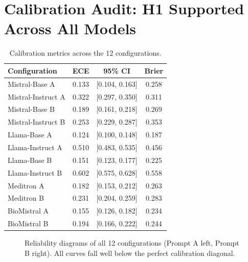 \section{Calibration Audit: H1 Supported Across All Models}
\label{sec:res-h1}


\begin{table}[htbp]
    \centering
    \caption{Calibration metrics across the 12 configurations.}
    \label{tab:res-calibration}
    \begin{tabular}{@{}lccc@{}}
        \toprule
        \textbf{Configuration} & \textbf{ECE} & \textbf{95\% CI} & \textbf{Brier} \\
        \midrule
        Mistral-Base A     & 0.133 & [0.104, 0.163] & 0.258 \\
        Mistral-Instruct A & 0.322 & [0.297, 0.350] & 0.311 \\
        Mistral-Base B     & 0.189 & [0.161, 0.218] & 0.269 \\
        Mistral-Instruct B & 0.253 & [0.229, 0.287] & 0.353 \\
        Llama-Base A       & 0.124 & [0.100, 0.148] & 0.187 \\
        Llama-Instruct A   & 0.510 & [0.483, 0.535] & 0.456 \\
        Llama-Base B       & 0.151 & [0.123, 0.177] & 0.225 \\
        Llama-Instruct B   & 0.602 & [0.575, 0.628] & 0.558 \\
        Meditron A         & 0.182 & [0.153, 0.212] & 0.263 \\
        Meditron B         & 0.231 & [0.204, 0.259] & 0.283 \\
        BioMistral A       & 0.155 & [0.126, 0.182] & 0.234 \\
        BioMistral B       & 0.194 & [0.166, 0.222] & 0.244 \\
        \bottomrule
    \end{tabular}
\end{table}

\begin{figure}[htbp]
    \centering
    \caption{Reliability diagrams of all 12 configurations (Prompt A left,
        Prompt B right). All curves fall well below the perfect calibration
        diagonal.}
    \label{fig:res-reliability}
\end{figure}

